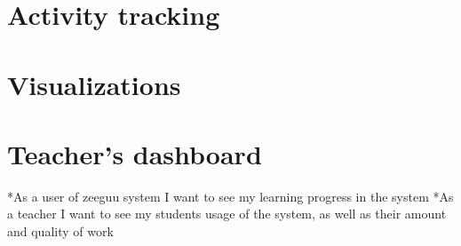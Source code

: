 \chapter{Activity tracking}


\chapter{Visualizations}


\chapter{Teacher's dashboard}


*As a user of zeeguu system I want to see my learning progress in the system
*As a teacher I want to see my students usage of the system, as well as their amount and quality of work